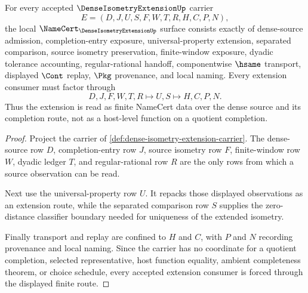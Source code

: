 \begin{theorem}
\label{thm:dense-isometry-extension-namecert-obligations}
For every accepted $\DenseIsometryExtensionUp$ carrier
$$
E=(D,J,U,S,F,W,T,R,H,C,P,N),
$$
the local $\NameCert_{\DenseIsometryExtensionUp}$ surface consists exactly of dense-source admission, completion-entry exposure, universal-property extension, separated comparison, source isometry preservation, finite-window exposure, dyadic tolerance accounting, regular-rational handoff, componentwise $\hsame$ transport, displayed $\Cont$ replay, $\Pkg$ provenance, and local naming. Every extension consumer must factor through
$$
D,J,F,W,T,R \longmapsto U,S \longmapsto H,C,P,N.
$$
Thus the extension is read as finite NameCert data over the dense source and its completion route, not as a host-level function on a quotient completion.
\end{theorem}
\begin{proof}
Project the carrier of \autoref{def:dense-isometry-extension-carrier}. The dense-source row $D$, completion-entry row $J$, source isometry row $F$, finite-window row $W$, dyadic ledger $T$, and regular-rational row $R$ are the only rows from which a source observation can be read.

Next use the universal-property row $U$. It repacks those displayed observations as an extension route, while the separated comparison row $S$ supplies the zero-distance classifier boundary needed for uniqueness of the extended isometry.

Finally transport and replay are confined to $H$ and $C$, with $P$ and $N$ recording provenance and local naming. Since the carrier has no coordinate for a quotient completion, selected representative, host function equality, ambient completeness theorem, or choice schedule, every accepted extension consumer is forced through the displayed finite route.
\end{proof}

